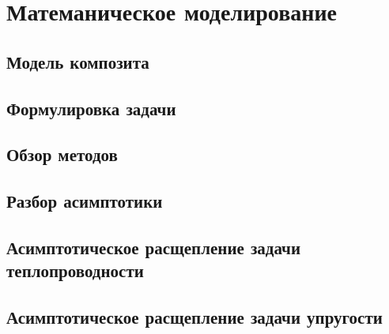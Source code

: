 \chapter{Матеманическое моделирование}\label{ch:ch1}

\section{Модель композита}\label{sec:ch1/sec1}



\section{Формулировка задачи}\label{sec:ch1/sec2}

\section{Обзор методов}\label{sec:ch1/sec3}

\section{Разбор асимптотики}\label{sec:ch1/sec4}

\section{Асимптотическое расщепление задачи теплопроводности}\label{sec:ch1/sec5}



\section{Асимптотическое расщепление задачи упругости}\label{sec:ch1/sec6}



\clearpage
